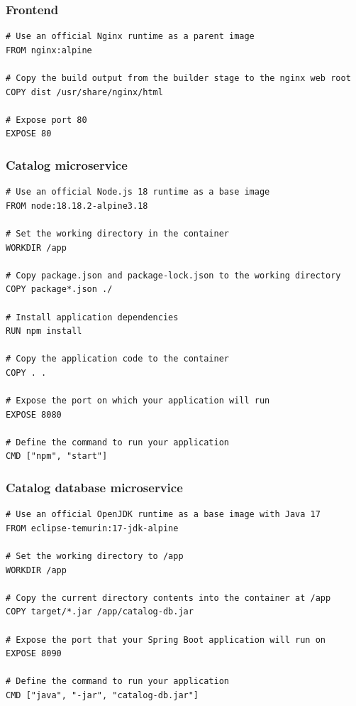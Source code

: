 \subsubsection*{Frontend}

\begin{lstlisting}[language=docker]
# Use an official Nginx runtime as a parent image
FROM nginx:alpine
  
# Copy the build output from the builder stage to the nginx web root
COPY dist /usr/share/nginx/html
  
# Expose port 80
EXPOSE 80
\end{lstlisting}

\subsubsection*{Catalog microservice}

\begin{lstlisting}[language=docker]
# Use an official Node.js 18 runtime as a base image
FROM node:18.18.2-alpine3.18

# Set the working directory in the container
WORKDIR /app

# Copy package.json and package-lock.json to the working directory
COPY package*.json ./

# Install application dependencies
RUN npm install

# Copy the application code to the container
COPY . .

# Expose the port on which your application will run
EXPOSE 8080

# Define the command to run your application
CMD ["npm", "start"]
\end{lstlisting}

\subsubsection*{Catalog database microservice}

\begin{lstlisting}[language=docker]
# Use an official OpenJDK runtime as a base image with Java 17
FROM eclipse-temurin:17-jdk-alpine

# Set the working directory to /app
WORKDIR /app

# Copy the current directory contents into the container at /app
COPY target/*.jar /app/catalog-db.jar

# Expose the port that your Spring Boot application will run on
EXPOSE 8090

# Define the command to run your application
CMD ["java", "-jar", "catalog-db.jar"]
\end{lstlisting}

